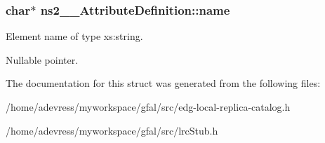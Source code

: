 \subsubsection{\setlength{\rightskip}{0pt plus 5cm}char$\ast$ \bf{ns2\_\-\_\-Attribute\-Definition::name}}\label{structns2____AttributeDefinition_8f8f5e508f0c5687519da332357f3bf5}


Element name of type xs:string. 

Nullable pointer. 

The documentation for this struct was generated from the following files:\begin{CompactItemize}
\item 
/home/adevress/myworkspace/gfal/src/edg-local-replica-catalog.h\item 
/home/adevress/myworkspace/gfal/src/lrc\-Stub.h\end{CompactItemize}
